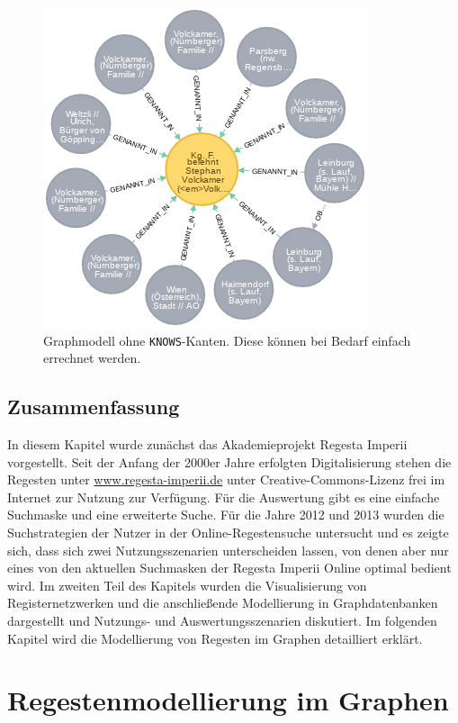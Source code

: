 \documentclass[ngerman,]{scrreprt}
\begin{document}
\begin{figure}
\centering
\includegraphics{Bilder/1zu1-Beziehungen-nur-Regest.png}
\caption{Graphmodell ohne \texttt{KNOWS}-Kanten. Diese können bei Bedarf einfach errechnet werden.}
\label{graphmodellohne}
\end{figure}

\hypertarget{zusammenfassung-1}{%
\section{Zusammenfassung}\label{zusammenfassung-1}}

In diesem Kapitel wurde zunächst das Akademieprojekt Regesta Imperii vorgestellt. Seit der Anfang der 2000er Jahre erfolgten Digitalisierung stehen die Regesten unter \url{www.regesta-imperii.de} unter Creative-Commons-Lizenz frei im Internet zur Nutzung zur Verfügung. Für die Auswertung gibt es eine einfache Suchmaske und eine erweiterte Suche. Für die Jahre 2012 und 2013 wurden die Suchstrategien der Nutzer in der Online-Regestensuche untersucht und es zeigte sich, dass sich zwei Nutzungsszenarien unterscheiden lassen, von denen aber nur eines von den aktuellen Suchmasken der Regesta Imperii Online optimal bedient wird. Im zweiten Teil des Kapitels wurden die Visualisierung von Registernetzwerken und die anschließende Modellierung in Graphdatenbanken dargestellt und Nutzungs- und Auswertungsszenarien diskutiert. Im folgenden Kapitel wird die Modellierung von Regesten im Graphen detailliert erklärt.

\hypertarget{regestenmodellierung-im-graphen}{%
\chapter{Regestenmodellierung im Graphen}\label{regestenmodellierung-im-graphen}}
\end{document}
